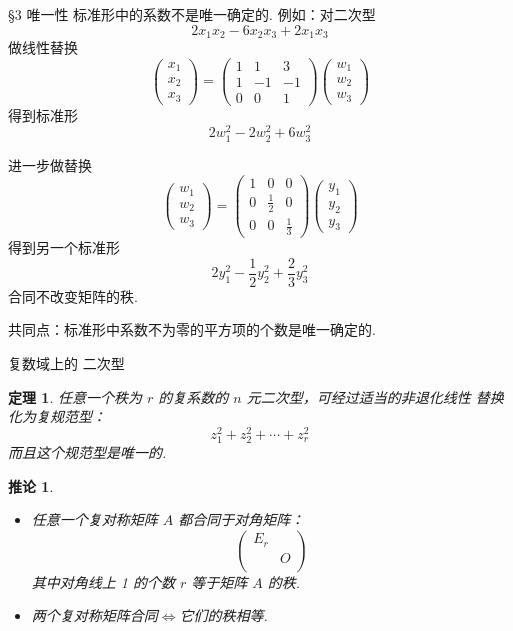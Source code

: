 \documentclass[13pt]{beamer}
\newtheorem{thm}{定理}
\newtheorem*{coro}{推论}
\begin{document}
\begin{frame}{\S 3 唯一性}
标准形中的系数不是唯一确定的. 例如：对二次型
\[
2 x_{1} x_{2}-6 x_{2} x_{3}+2 x_{1} x_{3}
\]
做线性替换
\[
\left(\begin{array}{l}
x_{1} \\
x_{2} \\
x_{3}
\end{array}\right)=\left(\begin{array}{ccc}
1 & 1 & 3 \\
1 & -1 & -1 \\
0 & 0 & 1
\end{array}\right)\left(\begin{array}{l}
w_{1} \\
w_{2} \\
w_{3}
\end{array}\right)
\]
得到标准形
\[
2 w_{1}^{2}-2 w_{2}^{2}+6 w_{3}^{2}
\]
\end{frame}

\begin{frame}
进一步做替换
\[
\left(\begin{array}{l}
w_{1} \\
w_{2} \\
w_{3}
\end{array}\right)=\left(\begin{array}{lll}
1 & 0 & 0 \\
0 & \frac{1}{2} & 0 \\
0 & 0 & \frac{1}{3}
\end{array}\right)\left(\begin{array}{l}
y_{1} \\
y_{2} \\
y_{3}
\end{array}\right)
\]
得到另一个标准形
\[
2 y_{1}^{2}-\frac{1}{2} y_{2}^{2}+\frac{2}{3} y_{3}^{2}
\]
合同不改变矩阵的秩. 


共同点：标准形中系数不为零的平方项的个数是唯一确定的. 
\end{frame}

\begin{frame}{复数域上的  二次型}
\small{
\begin{thm}
	任意一个秩为 $r$ 的复系数的 $n$ 元二次型，可经过适当的非退化线性
	替换化为复规范型：
	\[
	z_{1}^{2}+z_{2}^{2}+\cdots+z_{r}^{2}
	\]
	而且这个规范型是唯一的.
\end{thm}
\begin{coro}
\begin{itemize}
	\item 任意一个复对称矩阵 $A$ 都合同于对角矩阵：
	\[
	\left(\begin{array}{cc}
	E_r&\\
	& O\\
	\end{array}\right)
	\]
	其中对角线上 1 的个数 $r$ 等于矩阵 $A$ 的秩.
	
	\item 两个复对称矩阵合同$\Leftrightarrow$它们的秩相等.
\end{itemize}
\end{coro}


}
\end{frame}
\end{document}
